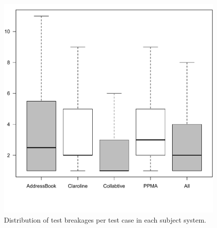 \begin{figure}[b]
\centering
\includegraphics[trim={0cm 0cm 0cm 0cm}, clip,width=0.78\columnwidth]{images/distribution.pdf}
\caption{Distribution of test breakages per test case in each subject system.}
\label{fig:distribution}
\end{figure} 

